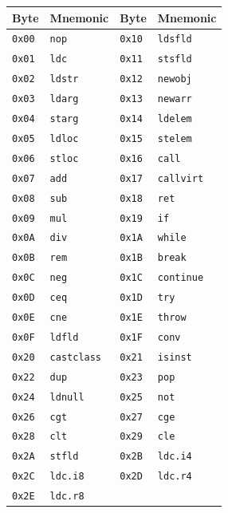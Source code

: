\documentclass[11pt,a4paper]{article}
\begin{document}
\begin{longtable}{llll}
  \toprule
  \textbf{Byte} & \textbf{Mnemonic} & \textbf{Byte} & \textbf{Mnemonic} \\
  \midrule
  \endhead
  \texttt{0x00} & \texttt{nop}      & \texttt{0x10} & \texttt{ldsfld}   \\
  \texttt{0x01} & \texttt{ldc}      & \texttt{0x11} & \texttt{stsfld}   \\
  \texttt{0x02} & \texttt{ldstr}    & \texttt{0x12} & \texttt{newobj}   \\
  \texttt{0x03} & \texttt{ldarg}    & \texttt{0x13} & \texttt{newarr}   \\
  \texttt{0x04} & \texttt{starg}    & \texttt{0x14} & \texttt{ldelem}   \\
  \texttt{0x05} & \texttt{ldloc}    & \texttt{0x15} & \texttt{stelem}   \\
  \texttt{0x06} & \texttt{stloc}    & \texttt{0x16} & \texttt{call}     \\
  \texttt{0x07} & \texttt{add}      & \texttt{0x17} & \texttt{callvirt} \\
  \texttt{0x08} & \texttt{sub}      & \texttt{0x18} & \texttt{ret}      \\
  \texttt{0x09} & \texttt{mul}      & \texttt{0x19} & \texttt{if}       \\
  \texttt{0x0A} & \texttt{div}      & \texttt{0x1A} & \texttt{while}    \\
  \texttt{0x0B} & \texttt{rem}      & \texttt{0x1B} & \texttt{break}    \\
  \texttt{0x0C} & \texttt{neg}      & \texttt{0x1C} & \texttt{continue} \\
  \texttt{0x0D} & \texttt{ceq}      & \texttt{0x1D} & \texttt{try}      \\
  \texttt{0x0E} & \texttt{cne}      & \texttt{0x1E} & \texttt{throw}    \\
  \texttt{0x0F} & \texttt{ldfld}    & \texttt{0x1F} & \texttt{conv}     \\
  \texttt{0x20} & \texttt{castclass}& \texttt{0x21} & \texttt{isinst}   \\
  \texttt{0x22} & \texttt{dup}      & \texttt{0x23} & \texttt{pop}      \\
  \texttt{0x24} & \texttt{ldnull}   & \texttt{0x25} & \texttt{not}      \\
  \texttt{0x26} & \texttt{cgt}      & \texttt{0x27} & \texttt{cge}      \\
  \texttt{0x28} & \texttt{clt}      & \texttt{0x29} & \texttt{cle}      \\
  \texttt{0x2A} & \texttt{stfld}    & \texttt{0x2B} & \texttt{ldc.i4}   \\
  \texttt{0x2C} & \texttt{ldc.i8}   & \texttt{0x2D} & \texttt{ldc.r4}   \\
  \texttt{0x2E} & \texttt{ldc.r8}   &               &                   \\
  \bottomrule
\end{longtable}
\end{document}
